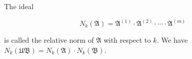 The ideal

$$N_k(\mathfrak{A}) = \mathfrak{A}^{(1)} \cdot \mathfrak{A}^{(2)} \cdot \cdots \cdot \mathfrak{A}^{(m)}$$

is called the relative norm of $\mathfrak{A}$ with respect to $k$. We have $N_k(\mathfrak{UB}) = N_k(\mathfrak{A}) \cdot N_k(\mathfrak{B})$.
